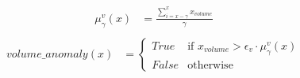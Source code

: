 \begin{align*}
    \mu_\gamma^v(x) &= \frac{\sum^x_{i=x-\gamma} x_{volume}}{\gamma}\\
\end{align*}
\begin{align}\label{eq:volume_anomaly}
    volume\_anomaly(x)&=
    \begin{cases}
        True  & \text{if $x_{volume} >    \epsilon_v \cdot \mu_\gamma^v(x)$}\\
        False & \text{otherwise}
    \end{cases}
\end{align}
